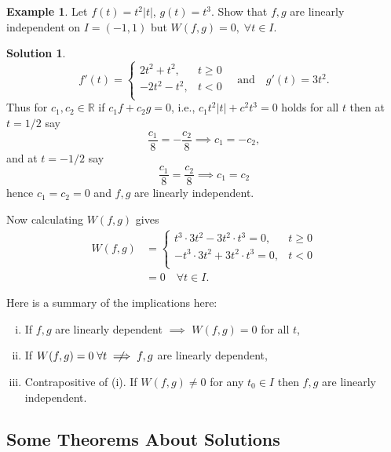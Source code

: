 \documentclass{article}
\theoremstyle{plain}
\theoremstyle{definition}
\newtheorem{exmp}{Example}[section]
\newtheorem*{sol}{Solution}
\numberwithin{equation}{section}
\begin{document}
\begin{tcolorbox}
    \begin{exmp}\label{exmp:WronskianContraEx}
        Let $f(t) = t^2\vert t \vert$, $g(t) = t^3$. Show that $f,g$ are linearly independent on $I=(-1,1)$ but $W(f,g)=0, \; \forall t \in I$.
    \end{exmp}
    \begin{sol}
        \[
        f'(t) = \begin{cases}
            2t^2 + t^2, & t\geq 0 \\
            -2t^2 - t^2, & t < 0 \\
        \end{cases} \quad \text{and} \quad g'(t) = 3t^2.
        \]
        Thus for $c_1,c_2 \in \mathbb{R}$ if $c_1f+c_2g=0$, i.e., $c_1t^2\vert t \vert + c^2 t^3 = 0$ holds for all $t$ then at $t=1/2$ say
        \[
        \frac{c_1}{8} = -\frac{c_2}{8} \implies c_1=-c_2,
        \]
        and at $t=-1/2$ say
        \[
            \frac{c_1}{8} = \frac{c_2}{8} \implies c_1=c_2
        \]
        hence $c_1=c_2=0$ and $f,g$ are linearly independent.

        Now calculating $W(f,g)$ gives
        \[
        \begin{aligned}
        W(f,g) &= \begin{cases}
            t^3 \cdot 3t^2 - 3t^2 \cdot t^3  = 0, & t \geq 0 \\
            -t^3 \cdot 3t^2 + 3t^2 \cdot t^3 = 0, & t < 0 \\
        \end{cases} \\
        &= 0 \quad \forall t \in I.
        \end{aligned}
        \]
    \end{sol}
\end{tcolorbox}

Here is a summary of the implications here:
\begin{enumerate}[(i)]
    \item If $f,g$ are linearly dependent $\implies$ $W(f,g)=0$ for all $t$,
    \item If $W(f,g)=0 \; \forall t \centernot\implies f,g$ are linearly dependent,
    \item Contrapositive of (i). If $W(f,g) \neq 0$ for any $t_0 \in I$ then $f,g$ are linearly independent.
\end{enumerate}

\subsection{Some Theorems About Solutions}
\end{document}
